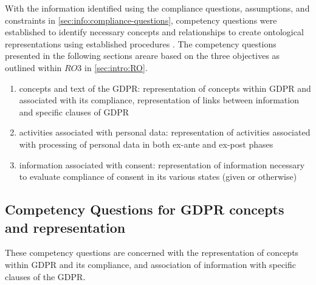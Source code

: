 With the information identified using the compliance questions, assumptions, and constraints in \autoref{sec:info:compliance-questions}, competency questions were established to identify necessary concepts and relationships to create ontological representations using established procedures \cite{noy,neon}.
The competency questions presented in the following sections areare based on the three objectives as outlined within $RO3$ in \autoref{sec:intro:RO}.  
\begin{enumerate}
    \item concepts and text of the GDPR: representation of concepts within GDPR and associated with its compliance, representation of links between information and specific clauses of GDPR
    \item activities associated with personal data: representation of activities associated with processing of personal data in both ex-ante and ex-post phases
    \item information associated with consent: representation of information necessary to evaluate compliance of consent in its various states (given or otherwise)
\end{enumerate}

\subsection{Competency Questions for GDPR concepts and representation}
These competency questions are concerned with the representation of concepts within GDPR and its compliance, and association of information with specific clauses of the GDPR.

